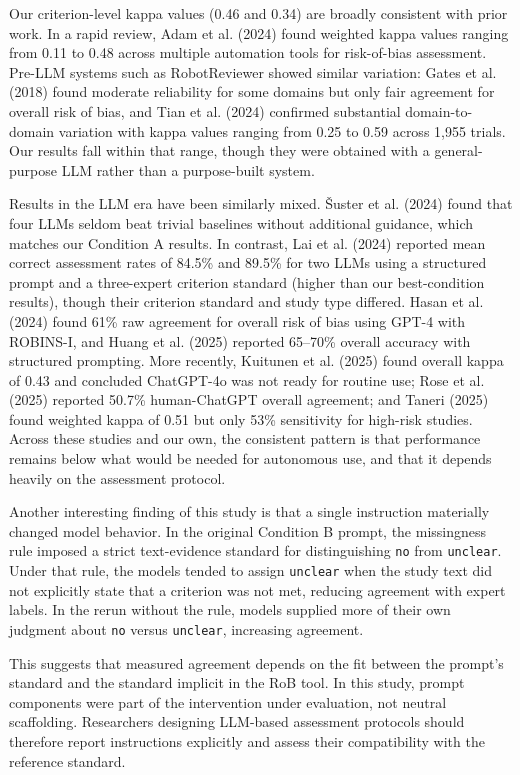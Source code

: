 \documentclass[11pt,a4paper]{article}
\begin{document}
Our criterion-level kappa values (0.46 and 0.34) are broadly consistent with prior work. In a rapid review, Adam et al. (2024) found weighted kappa values ranging from 0.11 to 0.48 across multiple automation tools for risk-of-bias assessment. Pre-LLM systems such as RobotReviewer showed similar variation: Gates et al. (2018) found moderate reliability for some domains but only fair agreement for overall risk of bias, and Tian et al. (2024) confirmed substantial domain-to-domain variation with kappa values ranging from 0.25 to 0.59 across 1,955 trials. Our results fall within that range, though they were obtained with a general-purpose LLM rather than a purpose-built system.

Results in the LLM era have been similarly mixed. Šuster et al. (2024) found that four LLMs seldom beat trivial baselines without additional guidance, which matches our Condition A results. In contrast, Lai et al. (2024) reported mean correct assessment rates of 84.5\% and 89.5\% for two LLMs using a structured prompt and a three-expert criterion standard (higher than our best-condition results), though their criterion standard and study type differed. Hasan et al. (2024) found 61\% raw agreement for overall risk of bias using GPT-4 with ROBINS-I, and Huang et al. (2025) reported 65–70\% overall accuracy with structured prompting. More recently, Kuitunen et al. (2025) found overall kappa of 0.43 and concluded ChatGPT-4o was not ready for routine use; Rose et al. (2025) reported 50.7\% human-ChatGPT overall agreement; and Taneri (2025) found weighted kappa of 0.51 but only 53\% sensitivity for high-risk studies. Across these studies and our own, the consistent pattern is that performance remains below what would be needed for autonomous use, and that it depends heavily on the assessment protocol.

Another interesting finding of this study is that a single instruction materially changed model behavior. In the original Condition B prompt, the missingness rule imposed a strict text-evidence standard for distinguishing \texttt{no} from \texttt{unclear}. Under that rule, the models tended to assign \texttt{unclear} when the study text did not explicitly state that a criterion was not met, reducing agreement with expert labels. In the rerun without the rule, models supplied more of their own judgment about \texttt{no} versus \texttt{unclear}, increasing agreement.

This suggests that measured agreement depends on the fit between the prompt's standard and the standard implicit in the RoB tool. In this study, prompt components were part of the intervention under evaluation, not neutral scaffolding. Researchers designing LLM-based assessment protocols should therefore report instructions explicitly and assess their compatibility with the reference standard.
\end{document}
